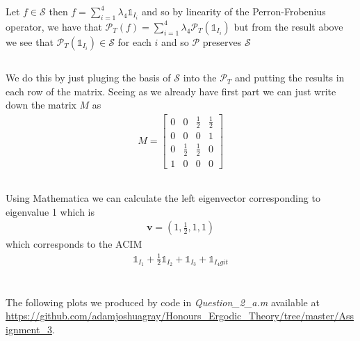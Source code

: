 \documentclass{unswmaths}
\begin{document}
    Let $ f \in \mathcal{S} $ then $ f = \sum_{i=1}^4 \lambda_4 \mathds{1}_{I_i} $ and so by linearity of the Perron-Frobenius operator, we have that $ \mathcal{P}_T(f) = \sum_{i=1}^4 \lambda_4 \mathcal{P}_T(\mathds{1}_{I_i}) $ but from the result above we see that $ \mathcal{P}_T(\mathds{1}_{I_i}) \in \mathcal{S} $ for each $ i $ and so $ \mathcal{P} $ preserves $ \mathcal{S} $
\subsection{}
    We do this by just pluging the basis of $ \mathcal{S} $ into the $ \mathcal{P}_T $ and putting the results in each row of the matrix. Seeing as we already have first part we can just write down the matrix $ M $ as
    \begin{align}
        M = \left[ 
        \begin{array}{cccc}
            0 & 0 & \frac{1}{2} & \frac{1}{2} \\
            0 & 0 & 0 & 1 \\
            0 & \frac{1}{2} & \frac{1}{2} & 0 \\
            1 & 0 & 0 & 0 
        \end{array}
        \right]
    \end{align}
\subsection{}
    Using Mathematica we can calculate the left eigenvector corresponding to eigenvalue 1 which is
    \begin{align}
        \mathbf{v} = (1,\frac{1}{2},1,1)
    \end{align}
    which corresponds to the ACIM
    \begin{align}
        \mathds{1}_{I_1} + \frac{1}{2}\mathds{1}_{I_2} + \mathds{1}_{I_3} + \mathds{1}_{I_4git}
    \end{align}
\clearpage
\section{}
\subsection{}
The following plots we produced by code in \emph{Question\_2\_a.m} available at \url{https://github.com/adamjoshuagray/Honours_Ergodic_Theory/tree/master/Assignment_3}.
\end{document}
